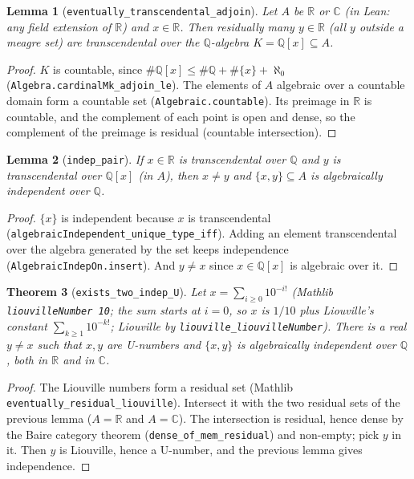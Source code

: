 \documentclass[11pt]{article}
\newtheorem{theorem}{Theorem}
\newtheorem{lemma}[theorem]{Lemma}
\theoremstyle{definition}
\begin{document}
\begin{lemma}[\texttt{eventually\_transcendental\_adjoin}]
Let $A$ be $\mathbb R$ or $\mathbb C$ (in Lean: any field extension of $\mathbb R$) and
$x\in\mathbb R$. Then residually many $y\in\mathbb R$ (all $y$ outside a meagre set) are
transcendental over the $\mathbb Q$-algebra $K=\mathbb Q[x]\subseteq A$.
\end{lemma}
\begin{proof}
$K$ is countable, since $\#\mathbb Q[x]\le\#\mathbb Q+\#\{x\}+\aleph_0$
(\texttt{Algebra.cardinalMk\_adjoin\_le}). The elements of $A$ algebraic over a countable domain
form a countable set (\texttt{Algebraic.countable}). Its preimage in $\mathbb R$ is countable,
and the complement of each point is open and dense, so the complement of the preimage is
residual (countable intersection).
\end{proof}

\begin{lemma}[\texttt{indep\_pair}]
If $x\in\mathbb R$ is transcendental over $\mathbb Q$ and $y$ is transcendental over
$\mathbb Q[x]$ (in $A$), then $x\ne y$ and $\{x,y\}\subseteq A$ is algebraically independent over
$\mathbb Q$.
\end{lemma}
\begin{proof}
$\{x\}$ is independent because $x$ is transcendental (\texttt{algebraicIndependent\_unique\_type\_iff}).
Adding an element transcendental over the algebra generated by the set keeps independence
(\texttt{AlgebraicIndepOn.insert}). And $y\ne x$ since $x\in\mathbb Q[x]$ is algebraic over it.
\end{proof}

\begin{theorem}[\texttt{exists\_two\_indep\_U}]
Let $x=\sum_{i\ge0}10^{-i!}$ (Mathlib \texttt{liouvilleNumber 10}; the sum starts at $i=0$, so
$x$ is $1/10$ plus Liouville's constant $\sum_{k\ge1}10^{-k!}$; Liouville by
\texttt{liouville\_liouvilleNumber}). There is a real $y\ne x$ such that $x,y$ are U-numbers and
$\{x,y\}$ is algebraically independent over $\mathbb Q$, both in $\mathbb R$ and in $\mathbb C$.
\end{theorem}
\begin{proof}
The Liouville numbers form a residual set (Mathlib \texttt{eventually\_residual\_liouville}).
Intersect it with the two residual sets of the previous lemma ($A=\mathbb R$ and
$A=\mathbb C$). The intersection is residual, hence dense by the Baire category theorem
(\texttt{dense\_of\_mem\_residual}) and non-empty; pick $y$ in it. Then $y$ is Liouville, hence a
U-number, and the previous lemma gives independence.
\end{proof}
\end{document}
